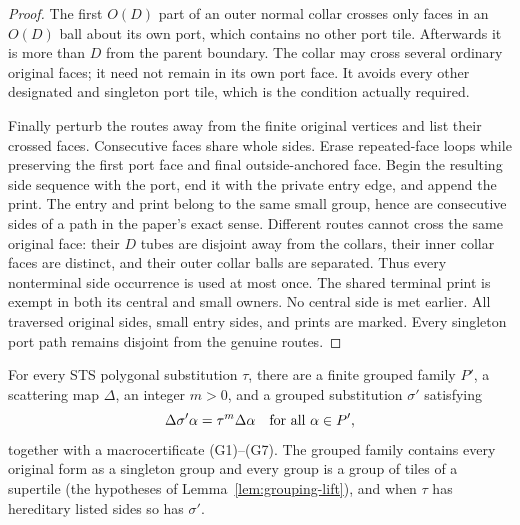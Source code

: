\begin{proof}
The first $O(D)$ part of an outer normal collar crosses only faces in
an $O(D)$ ball about its own port, which contains no other port tile.
Afterwards it is more than $D$ from the parent boundary.  The collar may
cross several ordinary original faces; it need not remain in its own
port face.  It avoids every other designated and singleton port tile,
which is the condition actually required.

Finally perturb the routes away from the finite original vertices and
list their crossed faces.  Consecutive faces share whole sides.  Erase
repeated-face loops while preserving the first port face and final
outside-anchored face.  Begin the resulting side sequence with the
port, end it with the private entry edge, and append the print.  The
entry and print belong to the same small group, hence are consecutive
sides of a path in the paper's exact sense.  Different routes cannot
cross the same original face: their $D$ tubes are disjoint away from
the collars, their inner collar faces are distinct, and their outer
collar balls are separated.  Thus every nonterminal side occurrence
is used at most once.  The shared terminal print is exempt in both
its central and small owners.  No central side is met earlier.
All traversed original sides, small entry sides, and prints are marked.
Every singleton port path remains disjoint from the genuine routes.
\end{proof}

\begin{lemma}
\label{lem:certificate-exists}
For every STS polygonal substitution $\tau$, there are a finite grouped
family $P'$, a scattering map $\Delta$, an integer $m>0$, and a grouped
substitution $\sigma'$ satisfying
\[
 \Delta\sigma'\alpha=\tau^m\Delta\alpha
 \quad\hbox{for all }\alpha\in P',
\]
together with a macrocertificate (G1)--(G7).  The grouped family contains
every original form as a singleton group and every group is a group of tiles
of a supertile (the hypotheses of
Lemma~\ref{lem:grouping-lift}), and when $\tau$ has hereditary listed
sides so has $\sigma'$.
\end{lemma}

